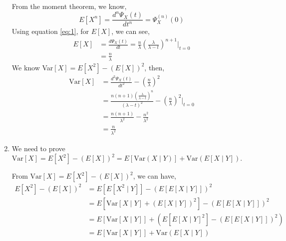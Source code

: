 \documentclass{article}
\begin{document}
\begin{enumerate}
				From the moment theorem, we know,
				\begin{equation}
					E[X^n] = \frac{d^n\Psi_{X}(t)}{dt^n} = \Psi_{X}^{(n)}(0)
					\label{eq:1}
				\end{equation}
				Using equation \ref{eq:1}, for $E[X]$, we can see,
				\begin{align*}
					E[X] &= \frac{d\Psi_{X}(t)}{dt} = \frac{n}{\lambda}\left(\frac{\lambda}{\lambda-t}\right)^{n+1} \bigg|_{t=0} \\
					&= \frac{n}{\lambda}
				\end{align*}
				We know Var$[X] = E[X^2] - \left(E[X]\right)^2$, then,
				\begin{align*}
					\mathrm{Var}[X] &= \frac{d^2\Psi_{X}(t)}{dt^2} - \left(\frac{n}{\lambda}\right)^2 \\
					&= \frac{n(n+1)\left(\frac{\lambda}{\lambda-t}\right)^n}{\left(\lambda-t\right)^2} - \left(\frac{n}{\lambda}\right)^2 \bigg|_{t=0} \\
					&= \frac{n(n+1)}{\lambda^2} - \frac{n^2}{\lambda^2} \\
					&= \frac{n}{\lambda^2}
				\end{align*}
			\item We need to prove $\mathrm{Var}[X] = E[X^2] - (E[X])^2 = E[\mathrm{Var}(X \mid Y)] + \mathrm{Var}(E[X \mid Y])$.

				From $\mathrm{Var}[X] = E[X^2] - (E[X])^2$, we can have,
				\begin{align*}
					E[X^2] - (E[X])^2 &= E[E[X^2 \mid Y]] - (E[E[X \mid Y]])^2 \\
					&= E[\mathrm{Var}[X \mid Y] + (E[X \mid Y])^2] - (E[E[X \mid Y]])^2 \\
					&= E[\mathrm{Var}[X \mid Y]] + (E[E[X \mid Y]^2] - (E[E[X \mid Y]])^2) \\
					&= E[\mathrm{Var}[X \mid Y]] + \mathrm{Var}(E[X \mid Y])
				\end{align*}
		\end{enumerate}
\end{document}
